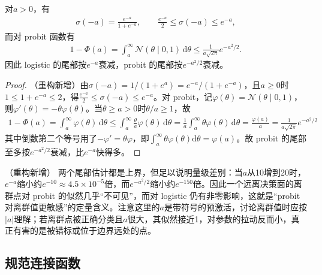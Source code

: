 \documentclass[../../main.tex]{subfiles}
\begin{document}
\begin{proposition}[尾部衰减的比较]\label{proposition:ch05-尾部衰减}
对$a>0$，有
\begin{align}
  \sigma(-a)=\frac{e^{-a}}{1+e^{-a}},\qquad \frac{e^{-a}}{2}\leqslant\sigma(-a)\leqslant e^{-a},
\end{align}
而对 probit 函数有
\begin{align}
  1-\Phi(a)=\int_{a}^{\infty}\mathcal{N}(\theta\mid0,1)\,\mathrm{d}\theta\leqslant\frac{1}{a\sqrt{2\pi}}e^{-a^{2}/2}.
\end{align}
因此 logistic 的尾部按$e^{-a}$衰减，probit 的尾部按$e^{-a^{2}/2}$衰减。
\end{proposition}

\begin{proof}
（重构新增）由$\sigma(-a)=1/(1+e^{a})=e^{-a}/(1+e^{-a})$，且$a\geqslant0$时$1\leqslant1+e^{-a}\leqslant2$，得$\frac{e^{-a}}{2}\leqslant\sigma(-a)\leqslant e^{-a}$。对 probit，记$\varphi(\theta)=\mathcal{N}(\theta\mid0,1)$，则$\varphi'(\theta)=-\theta\varphi(\theta)$。当$\theta\geqslant a>0$时$\theta/a\geqslant1$，故
\begin{align}
  1-\Phi(a)=\int_{a}^{\infty}\varphi(\theta)\,\mathrm{d}\theta\leqslant\int_{a}^{\infty}\frac{\theta}{a}\varphi(\theta)\,\mathrm{d}\theta=\frac{1}{a}\int_{a}^{\infty}\theta\varphi(\theta)\,\mathrm{d}\theta=\frac{\varphi(a)}{a}=\frac{1}{a\sqrt{2\pi}}e^{-a^{2}/2}
\end{align}
其中倒数第二个等号用了$-\varphi'=\theta\varphi$，即$\int_a^\infty\theta\varphi(\theta)\mathrm{d}\theta=\varphi(a)$。故 probit 的尾部至多按$e^{-a^{2}/2}$衰减，比$e^{-a}$快得多。
\end{proof}

\begin{remark}（重构新增）
两个尾部估计都是上界，但足以说明量级差别：当$a$从10增到20时，$e^{-a}$缩小约$e^{-10}\approx4.5\times10^{-5}$倍，而$e^{-a^{2}/2}$缩小约$e^{-150}$倍。因此一个远离决策面的离群点对 probit 的似然几乎“不可见”，而对 logistic 仍有非零影响，这就是“probit 对离群值更敏感”的定量含义。注意这里的$a$是带符号的预激活，讨论离群值时应按$|a|$理解；若离群点被正确分类且$a$很大，其似然接近1，对参数的拉动反而小，真正有害的是被错标或位于边界远处的点。
\end{remark}

\subsection{规范连接函数}\label{subsection:ch05-规范连接函数}
\end{document}
